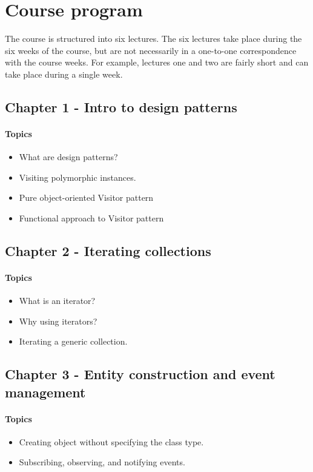 \section{Course program}
The course is structured into six lectures.
The six lectures take place during the six weeks of the course, but are not necessarily in a one-to-one correspondence with the course weeks. For example, lectures one and two are fairly short and can take place during a single week.

\subsection{Chapter 1 - Intro to design patterns}
\paragraph*{Topics}
\begin{itemize}
	\item What are design patterns?
	\item Visiting polymorphic instances.
	\item Pure object-oriented Visitor pattern
	\item Functional approach to Visitor pattern
\end{itemize}

\subsection{Chapter 2 - Iterating collections}
\paragraph*{Topics}			
\begin{itemize}
	\item What is an iterator?
	\item Why using iterators?
	\item Iterating a generic collection.
\end{itemize}


\subsection{Chapter 3 - Entity construction and event management}
\paragraph*{Topics}			
\begin{itemize}
	\item Creating object without specifying the class type.
	\item Subscribing, observing, and notifying events.
\end{itemize}



